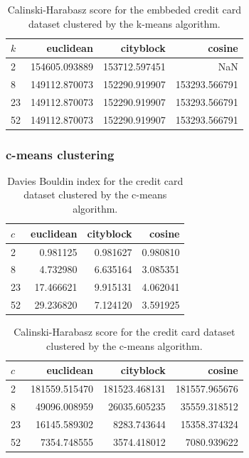 \begin{table}[ht!]
    \centering
   \begin{tabular}{lrrr}
\toprule
$k$ &      euclidean &      cityblock &         cosine \\
\midrule
2  &  154605.093889 &  153712.597451 &            NaN \\
8  &  149112.870073 &  152290.919907 &  153293.566791 \\
23 &  149112.870073 &  152290.919907 &  153293.566791 \\
52 &  149112.870073 &  152290.919907 &  153293.566791 \\
\bottomrule
\end{tabular}
    \caption{Calinski-Harabasz score for the embbeded credit card dataset clustered by the k-means algorithm.}
    \label{tab:ce_ch_k}
\end{table}

\subsubsection{c-means clustering}

\begin{table}[ht!]
    \centering
   \begin{tabular}{lrrr}
\toprule
$c$ &  euclidean &  cityblock &    cosine \\
\midrule
2  &   0.981125 &   0.981627 &  0.980810 \\
8  &   4.732980 &   6.635164 &  3.085351 \\
23 &  17.466621 &   9.915131 &  4.062041 \\
52 &  29.236820 &   7.124120 &  3.591925 \\
\bottomrule
\end{tabular}
    \caption{Davies Bouldin index for the credit card dataset clustered by the c-means algorithm.}
    \label{tab:c1_db_c}
\end{table}

\begin{table}[ht!]
    \centering
    \begin{tabular}{lrrr}
\toprule
$c$ &      euclidean &      cityblock &         cosine \\
\midrule
2  &  181559.515470 &  181523.468131 &  181557.965676 \\
8  &   49096.008959 &   26035.605235 &   35559.318512 \\
23 &   16145.589302 &    8283.743644 &   15358.374324 \\
52 &    7354.748555 &    3574.418012 &    7080.939622 \\
\bottomrule
\end{tabular}
    \caption{Calinski-Harabasz score for the credit card dataset clustered by the c-means algorithm.}
    \label{tab:c1_ch_c}
\end{table}

